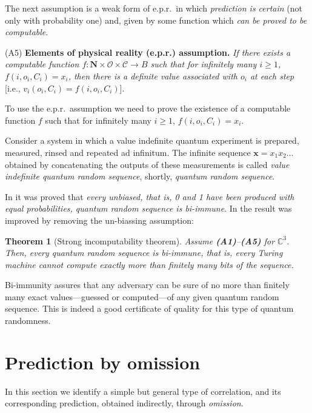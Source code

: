\documentclass[%
 preprint,
 showpacs,
 showkeys,
 preprintnumbers,
  amsmath,amssymb,
  aps,
 pra,
  longbibliography,
  floatfix,
 ]{revtex4-1}
\theoremstyle{plain}
\newtheorem{theorem}{Theorem}[section]
\newcommand{\seq}[1]{\mathbf{#1}}
\begin{document}
\begin{enumerate}
 The next assumption is a  weak form of e.p.r.\ in which {\em prediction is certain} (not only with probability one) and, given by some function which {\em can be  proved to be computable}.

 \noindent  (A5) {\bf Elements of physical reality (e.p.r.) assumption.} {\em If
there exists a computable function $f : \mathbf{N}\times \mathcal{O}\times \mathcal{C} \to B$
such that for infinitely many $i\ge 1$, $f(i,o_i,C_i)=x_i$, then there is a definite value associated with $o_i$ at each step}
[i.e., $v_i(o_i,C_i)=f(i,o_i,C_i)$].


To  use the e.p.r.\ assumption we need to prove the existence of a computable function $f$ such  that for infinitely many $i\ge 1$, $f(i,o_i,C_i)=x_i$.

\end{enumerate}

\medskip
  \fi


  Consider a system in which a value indefinite quantum experiment is prepared, measured, rinsed and repeated ad infinitum.
   The infinite sequence $\seq{x}=x_1 x_2 \dots$ obtained by concatenating the outputs of these measurements is called {\em value indefinite quantum random sequence}, shortly, {\em  quantum random sequence}.



 \medskip

In \cite{CS} it was proved that {\em every unbiased, that is,  0 and 1 have been produced with equal probabilities, quantum random sequence is bi-immune}. In \cite{ACCS} the result was improved by removing the un-biassing assumption:


\begin{theorem}[Strong incomputability theorem]
\label{thm:biimmunity} Assume {\bf (A1)}--{\bf (A5)} for $\mathbb{C}^3$. Then,  every quantum random sequence is bi-immune, that is, every Turing machine cannot compute exactly more than finitely many bits of the sequence.
\end{theorem}

Bi-immunity assures that any adversary can be sure of no more than finitely many exact values---guessed or computed---of any given quantum random sequence.
This is indeed a good certificate of quality for this type of quantum randomness.



\section{Prediction by omission}
\label{sect:omission}
 In this section we identify a simple but  general type of
correlation, and its corresponding prediction,  obtained indirectly,  through {\em omission}.
\end{document}
